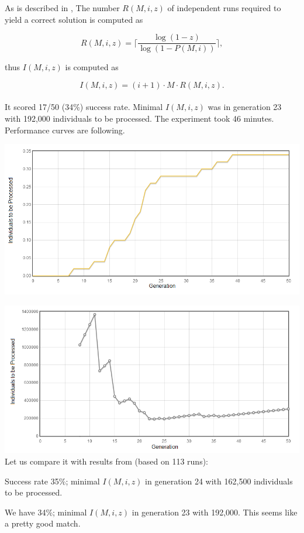 \documentclass[12pt,a4paper]{report}
\newcommand{\Lets}{Let us\xspace}
\begin{document}
As is described in \cite{koza92},
The number $R(M,i,z)$ of independent runs required to yield a correct solution 
is computed as
 
$$ R(M,i,z) = \lceil\frac{\log(1-z)}{\log(1-P(M,i))}\rceil ,$$

thus $I(M,i,z)$ is computed as

$$I(M,i,z) = (i+1) \cdot M \cdot R(M,i,z) .$$\\

It scored 17/50 (34\%) success rate. 
Minimal $I(M,i,z)$ was in generation 23 
with 192,000 individuals to be processed.
The experiment took 46 minutes.\\

Performance curves are following.

\includegraphics[scale=0.65]{reports/SSR/1/probabs.png}

\includegraphics[scale=0.65]{reports/SSR/1/indivs.png}\\

\Lets compare it with results from \cite{koza92} (based on 113 runs):

Success rate 35\%; minimal $I(M,i,z)$ in generation 24 
with 162,500 individuals to be processed.

We have 34\%; minimal $I(M,i,z)$ in generation 23 
with 192,000. This seems like a pretty good match.
\\
\end{document}

